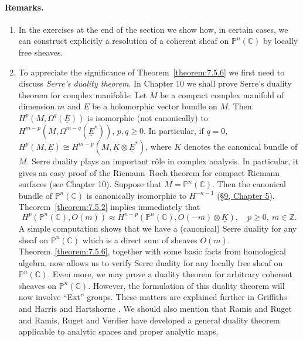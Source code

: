 \paragraph{Remarks.}
\begin{enumerate}
\item In the exercises at the end of the section we show how, in certain cases, we can construct explicitly a resolution of a coherent sheaf on $\mathbb{P}^n(\mathbb{C})$ by locally free sheaves.
\item To appreciate the significance of Theorem~\ref{theorem:7.5.6} we first need to discuss \emph{Serre's duality theorem}. In Chapter 10 we shall prove Serre's duality theorem for complex manifolds: Let $M$ be a compact complex manifold of dimension $m$ and $E$ be a holomorphic vector bundle on $M$. Then $H^p(M,\Omega^q(\underline{E}))$ is isomorphic (not canonically) to $H^{m-p}(M,\Omega^{m-q}(\underline{E}^*))$, $p,q\geq0$. In particular, if $q=0$, $H^p(M,\underline{E})\cong H^{m-p}(M,\underline{K}\otimes\underline{E}^*)$, where $K$ denotes the canonical bundle of $M$. Serre duality plays an important r\^ole in complex analysis. In particular, it gives an easy proof of the Riemann--Roch theorem for compact Riemann surfaces (see Chapter 10). Suppose that $M=\mathbb{P}^n(\mathbb{C})$. Then the canonical bundle of $\mathbb{P}^n(\mathbb{C})$ is canonically isomorphic to $H^{-n-1}$ (\hyperref[sec:5:9]{\S9, Chapter 5}). Theorem~\ref{theorem:7.5.2} implies immediately that
\[
H^p(\mathbb{P}^n(\mathbb{C}),O(m))\approx H^{n-p}(\mathbb{P}^n(\mathbb{C}),O(-m)\otimes\underline{K}),\quad p\geq0,\ m\in\mathbb{Z}.
\]
A simple computation shows that we have a (canonical) Serre duality for any sheaf on $\mathbb{P}^n(\mathbb{C})$ which is a direct sum of sheaves $O(m)$. Theorem~\ref{theorem:7.5.6}, together with some basic facts from homological algebra, now allows us to verify Serre duality for any locally free sheaf on $\mathbb{P}^n(\mathbb{C})$. Even more, we may prove a duality theorem for arbitrary coherent sheaves on $\mathbb{P}^n(\mathbb{C})$. However, the formulation of this duality theorem will now involve ``Ext'' groups. These matters are explained further in Griffiths and Harris \cite{bib:II:griffiths-p-and-harris-j:1} and Hartshorne \cite{bib:II:hartshorne-r:1,bib:II:hartshorne-r:2}. We should also mention that Ramis and Ruget \cite{bib:II:ramis-j-p-and-ruget-g:1} and Ramis, Ruget and Verdier \cite{bib:II:ramis-j-p-ruget-g-and-verdier-j-l:1} have
developed a general duality theorem applicable to analytic spaces and proper analytic maps.
\end{enumerate}

